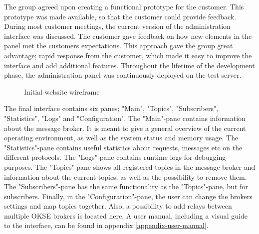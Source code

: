 The group agreed upon creating a functional prototype for the customer. This prototype was made available, so that the customer could provide feedback. During most customer meetings, the current version of the administration interface was discussed. The customer gave feedback on how new elements in the panel met the customers expectations. This approach gave the group great advantage; rapid response from the customer, which made it easy to improve the interface and add additional features. Throughout the lifetime of the development phase, the administration panel was continuously deployed on the test server.

\begin{center}
  \begin{figure}[ht!]
    \caption{Initial website wireframe}
    \label{fig:initial_prototype}
  \end{figure}
\end{center}

The final interface contains six panes; "Main", "Topics", "Subscribers", "Statistics", "Logs" and "Configuration". The "Main"-pane contains information about the message broker. It is meant to give a general overview of the current operating environment, as well as the system status and memory usage. The "Statistics"-pane contains useful statistics about requests, messages etc on the different protocols. The "Logs"-pane contains runtime logs for debugging purposes. The "Topics"-pane shows all registered topics in the message broker and information about the current topics, as well as the possibility to remove them. The "Subscribers"-pane has the same functionality as the "Topics"-pane, but for subscribers. Finally, in the "Configuration"-pane, the user can change the brokers settings and map topics together. Also, a possibility to add relays between multiple OKSE brokers is located here. A user manual, including a visual guide to the interface, can be found in appendix \ref{appendix-user-manual}.

